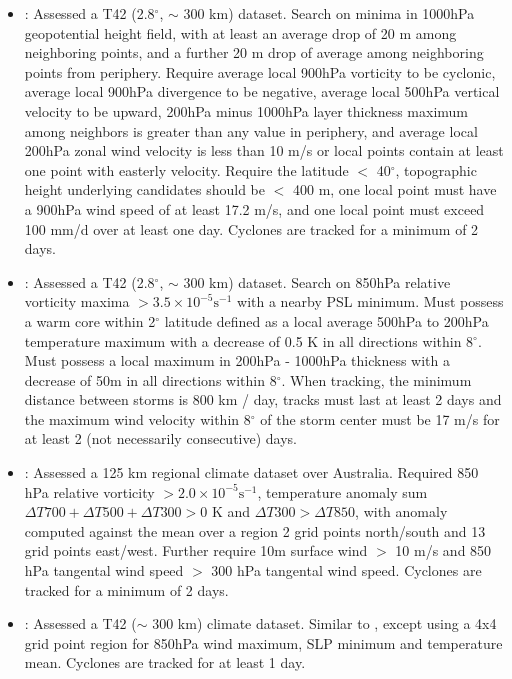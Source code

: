 \documentclass[gmdd, hvmath]{copernicus}
\begin{document}
\begin{itemize}
\item \cite{tsutsui1996simulated}:  Assessed a T42 (2.8$^\circ$, $\sim$ 300 km) dataset.  Search on minima in 1000hPa geopotential height field, with at least an average drop of 20 m among neighboring points, and a further 20 m drop of average among neighboring points from periphery.  Require average local 900hPa vorticity to be cyclonic, average local 900hPa divergence to be negative, average local 500hPa vertical velocity to be upward, 200hPa minus 1000hPa layer thickness maximum among neighbors is greater than any value in periphery, and average local 200hPa zonal wind velocity is less than 10 m/s or local points contain at least one point with easterly velocity.  Require the latitude $<$ 40$^\circ$, topographic height underlying candidates should be $<$ 400 m, one local point must have a 900hPa wind speed of at least 17.2 m/s, and one local point must exceed 100 mm/d over at least one day.  Cyclones are tracked for a minimum of 2 days.

\item \cite{vitart1997simulation, vitart1999impact, vitart2001sensitivity, vitart2003mozambique}:  Assessed a T42 (2.8$^\circ$, $\sim$ 300 km) dataset.  Search on 850hPa relative vorticity maxima $> 3.5 \times 10^{-5} \mbox{s}^{-1}$ with a nearby PSL minimum.  Must possess a warm core within 2$^\circ$ latitude defined as a local average 500hPa to 200hPa temperature maximum with a decrease of 0.5 K in all directions within 8$^\circ$.  Must possess a local maximum in 200hPa - 1000hPa thickness with a decrease of 50m in all directions within 8$^\circ$.  When tracking, the minimum distance between storms is 800 km / day, tracks must last at least 2 days and the maximum wind velocity within 8$^\circ$ of the storm center must be 17 m/s for at least 2 (not necessarily consecutive) days.

\item \cite{walsh1997objective, walsh1997tropical, walsh2000impact}:  Assessed a 125 km regional climate dataset over Australia.  Required 850 hPa relative vorticity $> 2.0 \times 10^{-5} \mbox{s}^{-1}$, temperature anomaly sum $\Delta T700+ \Delta T500+ \Delta T300 > 0$ K and $\Delta T300 > \Delta T850$, with anomaly computed against the mean over a region 2 grid points north/south and 13 grid points east/west.  Further require 10m surface wind $>$ 10 m/s and 850 hPa tangental wind speed $>$ 300 hPa tangental wind speed.  Cyclones are tracked for a minimum of 2 days.

\item \cite{krishnamurti1998impact}:  Assessed a T42 ($\sim$ 300 km) climate dataset.  Similar to \cite{bengtsson1995hurricane, bengtsson1996will}, except using a 4x4 grid point region for 850hPa wind maximum, SLP minimum and temperature mean.  Cyclones are tracked for at least 1 day.


\end{itemize}
\end{document}
